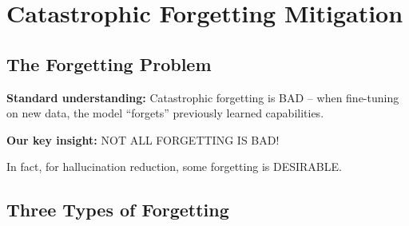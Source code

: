 \documentclass[12pt,a4paper]{article}
\theoremstyle{definition}
\begin{document}
\newpage

\section{Catastrophic Forgetting Mitigation}

\subsection{The Forgetting Problem}

\begin{problembox}
\textbf{Standard understanding:} Catastrophic forgetting is BAD -- when fine-tuning on new data, the model ``forgets'' previously learned capabilities.

\textbf{Our key insight:} NOT ALL FORGETTING IS BAD!

In fact, for hallucination reduction, some forgetting is DESIRABLE.
\end{problembox}

\subsection{Three Types of Forgetting}
\end{document}
